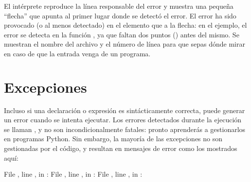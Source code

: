 \documentclass[a4,10pt,spanish]{sphinxmanual}
\begin{document}
\sphinxAtStartPar
El intérprete reproduce la línea responsable del error y muestra una pequeña “flecha” que apunta al primer lugar donde se detectó el error.  El error ha sido provocado (o al menos detectado) en el elemento que  a la flecha: en el ejemplo, el error se detecta en la función , ya que faltan dos puntos () antes del mismo.  Se muestran el nombre del archivo y el número de línea para que sepas dónde mirar en caso de que la entrada venga de un programa.


\section{Excepciones}
\label{\detokenize{tutorial/errors:exceptions}}\label{\detokenize{tutorial/errors:tut-exceptions}}
\sphinxAtStartPar
Incluso si una declaración o expresión es sintácticamente correcta, puede generar un error cuando se intenta ejecutar.  Los errores detectados durante la ejecución se llaman , y no son incondicionalmente fatales: pronto aprenderás a gestionarlos en programas Python.  Sin embargo, la mayoría de las excepciones no son gestionadas por el código, y resultan en mensajes de error como los mostrados aquí:

\begin{sphinxVerbatim}[commandchars=\\\{\}]
  
  File , line , in 
: 
  
  File , line , in 
: 
  
  File , line , in 
: 
\end{sphinxVerbatim}
\end{document}
